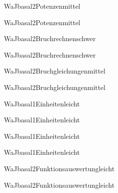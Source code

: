 \documentclass[12pt]{article}
\begin{document}
\begin{Add}{WaJ}{basal2}{Potenzen}{mittel}
\solution{ }
\end{Add}
\begin{Add}{WaJ}{basal2}{Potenzen}{mittel}
\end{Add}

\begin{Add}{WaJ}{basal2}{Bruchrechnen}{schwer}
\solution{ }
\end{Add}
\begin{Add}{WaJ}{basal2}{Bruchrechnen}{schwer}
\end{Add}

    \begin{Add}{WaJ}{basal2}{Bruchgleichungen}{mittel}
    \solution{ }
    \end{Add}
    \begin{Add}{WaJ}{basal2}{Bruchgleichungen}{mittel}
    \end{Add}
    

\begin{Add}{WaJ}{basal1}{Einheiten}{leicht}
\solution{ }
\end{Add}
\begin{Add}{WaJ}{basal1}{Einheiten}{leicht}
\end{Add}

\begin{Add}{WaJ}{basal1}{Einheiten}{leicht}
\solution{ }
\end{Add}
\begin{Add}{WaJ}{basal1}{Einheiten}{leicht}
\end{Add}

    \begin{Add}{WaJ}{basal2}{Funktionsauswertung}{leicht}
    \solution{ }
    \end{Add}
    \begin{Add}{WaJ}{basal2}{Funktionsauswertung}{leicht}
    \end{Add}
    
\end{document}
